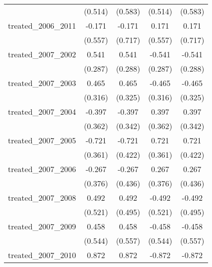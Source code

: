 {\begin{tabular}{l*{4}{c}}
            &     (0.514)         &     (0.583)         &     (0.514)         &     (0.583)         \\
[1em]
treated\_2006\_2011&      -0.171         &      -0.171         &       0.171         &       0.171         \\
            &     (0.557)         &     (0.717)         &     (0.557)         &     (0.717)         \\
[1em]
treated\_2007\_2002&       0.541         &       0.541         &      -0.541         &      -0.541         \\
            &     (0.287)         &     (0.288)         &     (0.287)         &     (0.288)         \\
[1em]
treated\_2007\_2003&       0.465         &       0.465         &      -0.465         &      -0.465         \\
            &     (0.316)         &     (0.325)         &     (0.316)         &     (0.325)         \\
[1em]
treated\_2007\_2004&      -0.397         &      -0.397         &       0.397         &       0.397         \\
            &     (0.362)         &     (0.342)         &     (0.362)         &     (0.342)         \\
[1em]
treated\_2007\_2005&      -0.721\sym{*}  &      -0.721         &       0.721\sym{*}  &       0.721         \\
            &     (0.361)         &     (0.422)         &     (0.361)         &     (0.422)         \\
[1em]
treated\_2007\_2006&      -0.267         &      -0.267         &       0.267         &       0.267         \\
            &     (0.376)         &     (0.436)         &     (0.376)         &     (0.436)         \\
[1em]
treated\_2007\_2008&       0.492         &       0.492         &      -0.492         &      -0.492         \\
            &     (0.521)         &     (0.495)         &     (0.521)         &     (0.495)         \\
[1em]
treated\_2007\_2009&       0.458         &       0.458         &      -0.458         &      -0.458         \\
            &     (0.544)         &     (0.557)         &     (0.544)         &     (0.557)         \\
[1em]
treated\_2007\_2010&       0.872         &       0.872         &      -0.872         &      -0.872         \\

\end{tabular}}
